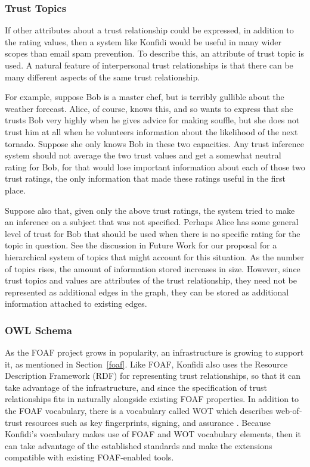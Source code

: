 \documentclass[letterpaper]{www2006-submission}
\begin{document}
\subsubsection{Trust Topics}
If other attributes about a trust relationship could be expressed, in addition to the rating values, then a system like Konfidi would be useful in many wider scopes than email spam prevention.  To describe this, an attribute of trust topic is used.  A natural feature of interpersonal trust relationships is that there can be many different aspects of the same trust relationship.  

For example, suppose Bob is a master chef, but is terribly gullible about the weather forecast.  Alice, of course, knows this, and so wants to express that she trusts Bob very highly when he gives advice for making souffle, but she does not trust him at all when he volunteers information about the likelihood of the next tornado.  Suppose she only knows Bob in these two capacities.  Any trust inference system should not average the two trust values and get a somewhat neutral rating for Bob, for that would lose important information about each of those two trust ratings, the only information that made these ratings useful in the first place.

Suppose also that, given only the above trust ratings, the system tried to make an inference on a subject that was not specified.  Perhaps Alice has some general level of trust for Bob that should be used when there is no specific rating for the topic in question.  See the discussion in Future Work for our proposal for a hierarchical system of topics that might account for this situation.  As the number of topics rises, the amount of information stored increases in size.  However, since trust topics and values are attributes of the trust relationship, they need not be represented as additional edges in the graph, they can be stored as additional information attached to existing edges.

\subsubsection{OWL Schema}
\label{owlschema}
As the FOAF project grows in popularity, an infrastructure is growing to support it, as mentioned in Section~\ref{foaf}.  Like FOAF, Konfidi also uses the Resource Description Framework (RDF) \citep{rdf} for representing trust relationships, so that it can take advantage of the infrastructure, and since the specification of trust relationships fits in naturally alongside existing FOAF properties.  In addition to the FOAF vocabulary, there is a vocabulary called WOT which describes web-of-trust resources such as key fingerprints, signing, and assurance \citep{wot}.  Because Konfidi's vocabulary makes use of FOAF and WOT vocabulary elements, then it can take advantage of the established standards and make the extensions compatible with existing FOAF-enabled tools.
\end{document}
